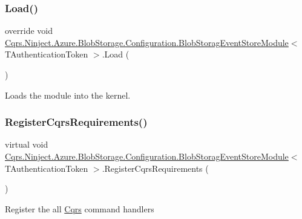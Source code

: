 \subsubsection{\texorpdfstring{Load()}{Load()}}
{\footnotesize\ttfamily override void \hyperlink{classCqrs_1_1Ninject_1_1Azure_1_1BlobStorage_1_1Configuration_1_1BlobStoragEventStoreModule}{Cqrs.\+Ninject.\+Azure.\+Blob\+Storage.\+Configuration.\+Blob\+Storag\+Event\+Store\+Module}$<$ T\+Authentication\+Token $>$.Load (\begin{DoxyParamCaption}{ }\end{DoxyParamCaption})}



Loads the module into the kernel. 

\mbox{\label{classCqrs_1_1Ninject_1_1Azure_1_1BlobStorage_1_1Configuration_1_1BlobStoragEventStoreModule_a5810aefc5c1fbd322ed791afae59d71c_a5810aefc5c1fbd322ed791afae59d71c}} 
\subsubsection{\texorpdfstring{Register\+Cqrs\+Requirements()}{RegisterCqrsRequirements()}}
{\footnotesize\ttfamily virtual void \hyperlink{classCqrs_1_1Ninject_1_1Azure_1_1BlobStorage_1_1Configuration_1_1BlobStoragEventStoreModule}{Cqrs.\+Ninject.\+Azure.\+Blob\+Storage.\+Configuration.\+Blob\+Storag\+Event\+Store\+Module}$<$ T\+Authentication\+Token $>$.Register\+Cqrs\+Requirements (\begin{DoxyParamCaption}{ }\end{DoxyParamCaption})\hspace{0.3cm}{\ttfamily [virtual]}}



Register the all \hyperlink{namespaceCqrs}{Cqrs} command handlers 

